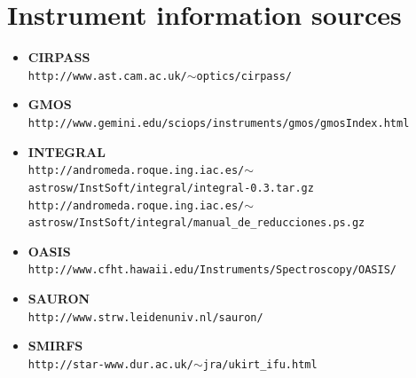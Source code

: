 \documentclass[twoside,11pt]{article}
\newcommand{\htmladdnormallink}[2]{#1}
\newcommand{\xlabel}[1]{}
\begin{document}
{%

\newpage
\section{\xlabel{sc16_available}Instrument information sources\label{sc16_available}}

\begin{small}
\begin{itemize}

\item {\bf\label{sc16_available_cirpass}CIRPASS}\\
\htmladdnormallink{{\tt http://www.ast.cam.ac.uk/$\sim$optics/cirpass/}}{http://www.ast.cam.ac.uk/~optics/cirpass/}

\item {\bf\label{sc16_available_gmos}GMOS}\\
\htmladdnormallink{{\tt http://www.gemini.edu/sciops/instruments/gmos/gmosIndex.html}}{http://www.gemini.edu/sciops/instruments/gmos/gmosIndex.html}

\item {\bf\label{sc16_available_integral}INTEGRAL}\\
\htmladdnormallink{{\tt http://andromeda.roque.ing.iac.es/$\sim$astrosw/InstSoft/integral/integral-0.3.tar.gz}}{http://andromeda.roque.ing.iac.es/~astrosw/InstSoft/integral/integral-0.3.tar.gz}\\
\htmladdnormallink{{\tt http://andromeda.roque.ing.iac.es/$\sim$astrosw/InstSoft/integral/manual\_de\_reducciones.ps.gz}}{http://andromeda.roque.ing.iac.es/~astrosw/InstSoft/integral/manual_de_reducciones.ps.gz}

\item {\bf\label{sc16_available_oasis}OASIS}\\
\htmladdnormallink{{\tt http://www.cfht.hawaii.edu/Instruments/Spectroscopy/OASIS/}}{http://www.cfht.hawaii.edu/Instruments/Spectroscopy/OASIS/}

\item {\bf\label{sc16_available_sauron}SAURON}\\
\htmladdnormallink{{\tt http://www.strw.leidenuniv.nl/sauron/}}{http://www.strw.leidenuniv.nl/sauron/}

\item {\bf\label{sc16_available_smirfs}SMIRFS}\\
\htmladdnormallink{{\tt http://star-www.dur.ac.uk/$\sim$jra/ukirt\_ifu.html}}{http://star-www.dur.ac.uk/~jra/ukirt_ifu.html}


\end{itemize}
\end{small}}
\end{document}

